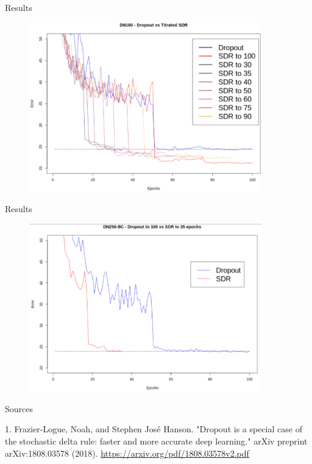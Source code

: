 \documentclass{beamer}
\begin{document}
\begin{frame}{Results}
\begin{figure}[h]
\includegraphics[width=0.9\textwidth]{img/titrated}
\end{figure}
\end{frame}
\begin{frame}{Results}
\begin{figure}[h]
\includegraphics[width=0.9\textwidth]{img/dropout_vs_sdr}
\end{figure}
\end{frame}


\begin{frame}{Sources}

\begin{thebibliography}{0}

   1. Frazier-Logue, Noah, and Stephen José Hanson. "Dropout is a special case of the stochastic delta rule: faster and more accurate deep learning." arXiv preprint arXiv:1808.03578 (2018). \url{https://arxiv.org/pdf/1808.03578v2.pdf}
  
\end{thebibliography}

\end{frame}

 
 
 
\end{document}
